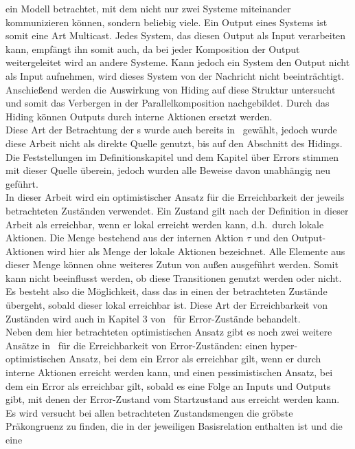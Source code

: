 ein Modell betrachtet, mit dem nicht nur zwei Systeme miteinander kommunizieren können,
sondern beliebig viele. Ein Output eines Systems ist somit eine Art Multicast.
Jedes System, das diesen Output als Input verarbeiten kann, empfängt ihn somit auch,
da bei jeder Komposition der Output weitergeleitet wird an andere Systeme.
Kann jedoch ein System den Output nicht als Input aufnehmen, wird dieses System von
der Nachricht nicht beeinträchtigt.\\
Anschießend werden die Auswirkung von Hiding auf diese Struktur
untersucht und somit das Verbergen in der Parallelkomposition nachgebildet.
Durch das Hiding können Outputs durch interne Aktionen ersetzt werden.\\
Diese Art der Betrachtung der
\EIO{}s wurde auch bereits in~\cite{Schlosser2012BA} gewählt, jedoch wurde
diese Arbeit nicht als direkte Quelle genutzt, bis auf den Abschnitt des
Hidings. Die Feststellungen im Definitionskapitel und dem Kapitel über
Errors stimmen mit dieser Quelle überein, jedoch wurden alle Beweise davon unabhängig neu
geführt.\\
In dieser Arbeit wird ein optimistischer Ansatz für die Erreichbarkeit
der jeweils betrachteten Zuständen verwendet. Ein Zustand gilt nach der Definition in dieser
Arbeit als erreichbar, wenn er lokal erreicht
werden kann, d.h.\ durch lokale Aktionen. Die Menge bestehend aus der internen
Aktion $\tau$ und den Output-Aktionen wird hier als Menge der lokale Aktionen
bezeichnet.
Alle Elemente aus dieser Menge können ohne weiteres Zutun von außen ausgeführt
werden. Somit kann nicht beeinflusst werden, ob diese Transitionen genutzt
werden oder nicht. Es besteht also die Möglichkeit, dass das \EIO{} in einen
der betrachteten Zustände übergeht, sobald dieser lokal erreichbar ist. Diese Art der
Erreichbarkeit von Zuständen wird auch in Kapitel 3 von~\cite{Vogler2014EIO}
für Error-Zustände behandelt.\\
Neben dem hier betrachteten optimistischen Ansatz gibt es noch zwei weitere
Ansätze in~\cite{Vogler2014EIO} für die Erreichbarkeit von Error-Zuständen:
einen hyper-optimistischen Ansatz, bei dem ein Error als erreichbar gilt, wenn
er durch interne Aktionen erreicht werden kann, und einen pessimistischen
Ansatz, bei dem ein Error als erreichbar gilt, sobald es eine Folge an Inputs
und Outputs gibt, mit denen der Error-Zustand vom Startzustand aus erreicht
werden kann.\\
Es wird versucht bei allen betrachteten Zustandsmengen die gröbste Präkongruenz zu
finden, die in der jeweiligen Basisrelation enthalten ist und die eine
